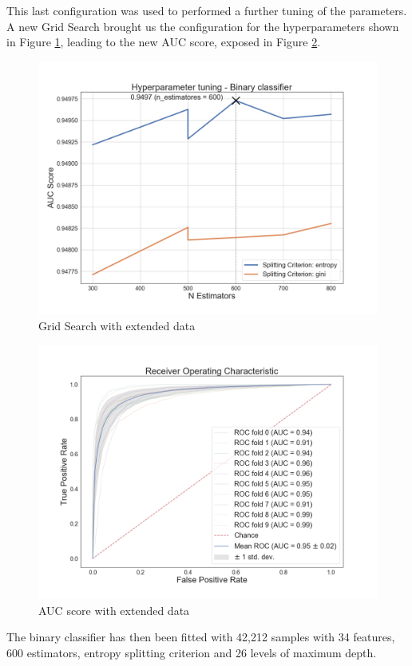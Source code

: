This last configuration was used to performed a further tuning of the parameters.
A new Grid Search brought us the configuration for the hyperparameters shown in Figure \ref{fig:bon_tuning_refil}, leading to the new AUC score, exposed in Figure \ref{fig:bon_refil_auc}.
\begin{figure}[htp!]
	\centering
	\includegraphics[width=\columnwidth]{chapter5/figure/bon_tuning_refill.png}
	\caption{Grid Search with extended data}
	\label{fig:bon_tuning_refil}
\end{figure}
\begin{figure}[htp!]
	\centering
	\includegraphics[width=\columnwidth]{chapter5/figure/refill_auc.png}
	\caption{AUC score with extended data}
	\label{fig:bon_refil_auc}
\end{figure}
The binary classifier has then been fitted with 42,212 samples with 34 features, 600 estimators, entropy splitting criterion and 26 levels of maximum depth.

